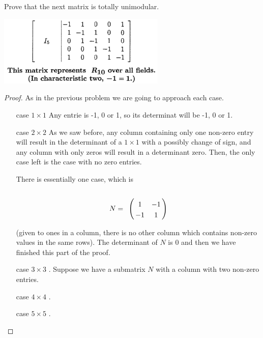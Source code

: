\prob
{
    Prove that the next matrix is totally unimodular.
    \begin{center}
        \includegraphics[width=8cm]{Test3/Problem2/R10.png}
    \end{center}\pn
}
\begin{proof}
    As in the previous problem we are going to approach each case.
    
    \begin{itemize}
        \item [case $1 \times 1$]
            Any entrie is -1, 0 or 1, so its determinat will be -1, 0 or 1.\pn
        \item [case $2 \times 2$]
            As we saw before, any column containing only one non-zero entry will result in the determinant of a 
            $1 \times 1$ with a possibly change of sign, and any column with only zeros will result in a determinant
            zero. Then, the only case left is the case with no zero entries.\pn
            
            There is essentially one case, which is
                \begin{align}
                    N =
                        \bordermatrix{
                                &       &       \cr
                                &   1   &  -1   \cr
                                &  -1   &   1  
                        }    
                \end{align}
                
           (given to ones in a column, there is no other column which contains non-zero values in the same rows).
           The determinant of $N$ is 0 and then we have finished this part of the proof.
        
        \item [case $3 \times 3$].
            Suppose we have a submatrix $N$ with a column with two non-zero entries.
        \item [case $4 \times 4$].
        \item [case $5 \times 5$].
    \end{itemize}
\end{proof}